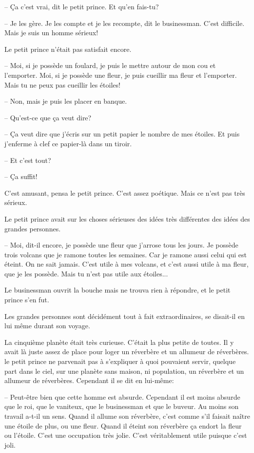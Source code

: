 \documentclass[a4paper]{report}
\begin{document}
-- Ça c'est vrai, dit le petit prince. Et qu'en fais-tu?

-- Je les gère. Je les compte et je les recompte, dit le businessman. C'est difficile. Mais je suis un homme sérieux!

Le petit prince n'était pas satisfait encore.

-- Moi, si je possède un foulard, je puis le mettre autour de mon cou et l'emporter. Moi, si je possède une fleur, je puis cueillir ma fleur et l'emporter. Mais tu ne peux pas cueillir les étoiles!

-- Non, mais je puis les placer en banque.

-- Qu'est-ce que ça veut dire?

-- Ça veut dire que j'écris sur un petit papier le nombre de mes étoiles. Et puis j'enferme à clef ce papier-là dans un tiroir.

-- Et c'est tout?

-- Ça suffit!

C'est amusant, pensa le petit prince. C'est assez poétique. Mais ce n'est pas très sérieux.

Le petit prince avait sur les choses sérieuses des idées très différentes des idées des grandes personnes.

-- Moi, dit-il encore, je possède une fleur que j'arrose tous les jours. Je possède trois volcans que je ramone toutes les semaines. Car je ramone aussi celui qui est éteint. On ne sait jamais. C'est utile à mes volcans, et c'est aussi utile à ma fleur, que je les possède. Mais tu n'est pas utile aux étoiles...

Le businessman ouvrit la bouche mais ne trouva rien à répondre, et le petit prince s'en fut.

Les grandes personnes sont décidément tout à fait extraordinaires, se disait-il en lui même durant son voyage.

\parachapter{} %
La cinquième planète était très curieuse. C'était la plus petite de toutes. Il y avait là juste assez de place pour loger un réverbère et un allumeur de réverbères. le petit prince ne parvenait pas à s'expliquer à quoi pouvaient servir, quelque part dans le ciel, sur une planète sans maison, ni population, un réverbère et un allumeur de réverbères. Cependant il se dit en lui-même:

--  Peut-être bien que cette homme est absurde. Cependant il est moins absurde que le roi, que le vaniteux, que le businessman et que le buveur. Au moins son travail a-t-il un sens. Quand il allume son réverbère, c'est comme s'il faisait naître une étoile de plus, ou une fleur. Quand il éteint son réverbère ça endort la fleur ou l'étoile. C'est une occupation très jolie. C'est véritablement utile puisque c'est joli.
\end{document}
